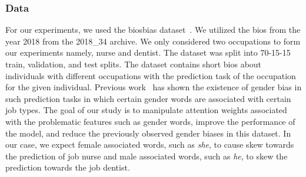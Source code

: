 \subsubsection{Data}
For our experiments, we used the biosbias dataset~\cite{de2019bias}. We utilized the bios from the year 2018 from the 2018\_34 archive. We only considered two occupations to form our experiments namely, nurse and dentist. The dataset was split into 70-15-15 train, validation, and test splits. The dataset contains short bios about individuals with different occupations with the prediction task of the occupation for the given individual. Previous work~\cite{de2019bias} has shown the existence of gender bias in such prediction tasks in which certain gender words are associated with certain job types. The goal of our study is to manipulate attention weights associated with the problematic features such as gender words, improve the performance of the model, and reduce the previously observed gender biases in this dataset. In our case, we expect female associated words, such as \textit{she}, to cause skew towards the prediction of job nurse and male associated words, such as \textit{he}, to skew the prediction towards the job dentist.
